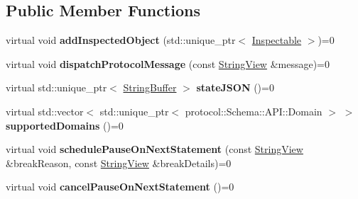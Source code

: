 \subsection*{Public Member Functions}
\begin{DoxyCompactItemize}
\item 
\mbox{\label{classv8__inspector_1_1V8InspectorSession_a2fb546beada5045879ba599a26799aed}} 
virtual void {\bfseries add\+Inspected\+Object} (std\+::unique\+\_\+ptr$<$ \mbox{\hyperlink{classv8__inspector_1_1V8InspectorSession_1_1Inspectable}{Inspectable}} $>$)=0
\item 
\mbox{\label{classv8__inspector_1_1V8InspectorSession_ad5b10f6378078183655cd2b369e29aa9}} 
virtual void {\bfseries dispatch\+Protocol\+Message} (const \mbox{\hyperlink{classv8__inspector_1_1StringView}{String\+View}} \&message)=0
\item 
\mbox{\label{classv8__inspector_1_1V8InspectorSession_aea07fa37b60124d62c553ff148e17227}} 
virtual std\+::unique\+\_\+ptr$<$ \mbox{\hyperlink{classv8__inspector_1_1StringBuffer}{String\+Buffer}} $>$ {\bfseries state\+J\+S\+ON} ()=0
\item 
\mbox{\label{classv8__inspector_1_1V8InspectorSession_a70e125227f0b485f70a72c69d70a736e}} 
virtual std\+::vector$<$ std\+::unique\+\_\+ptr$<$ protocol\+::\+Schema\+::\+A\+P\+I\+::\+Domain $>$ $>$ {\bfseries supported\+Domains} ()=0
\item 
\mbox{\label{classv8__inspector_1_1V8InspectorSession_a34ccd93c49008617d83b083a66dd0717}} 
virtual void {\bfseries schedule\+Pause\+On\+Next\+Statement} (const \mbox{\hyperlink{classv8__inspector_1_1StringView}{String\+View}} \&break\+Reason, const \mbox{\hyperlink{classv8__inspector_1_1StringView}{String\+View}} \&break\+Details)=0
\item 
\mbox{\label{classv8__inspector_1_1V8InspectorSession_ad2fc03b00f72ed1d126523611c2ee4f4}} 
virtual void {\bfseries cancel\+Pause\+On\+Next\+Statement} ()=0
\item 
\mbox{\label{classv8__inspector_1_1V8InspectorSession_a1239ec98b9499e08271fb69564310c6f}} 

\end{DoxyCompactItemize}
